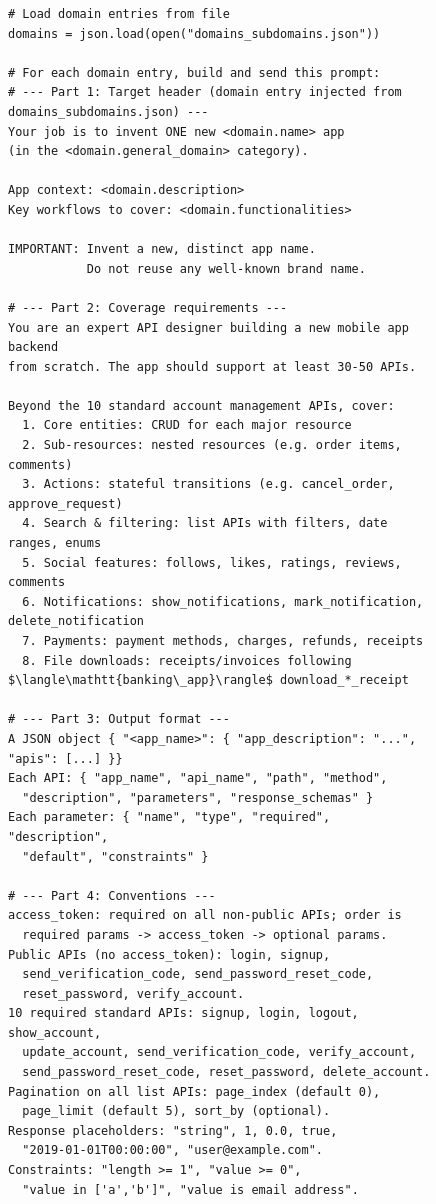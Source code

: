 \begin{figure}[t]
\begin{lstlisting}[style=prettyprompt,
  basicstyle=\ttfamily\scriptsize,
  breaklines=true,
  columns=fullflexible,
  captionpos=b,
  caption={Abbreviated structure of the Gemini prompt used for synthetic app generation. Domain entries are loaded from \texttt{domains\_subdomains.json} at runtime; \texttt{<domain.*>} placeholders are filled from the current entry. Ellipses (\texttt{...}) denote sections paraphrased for brevity.},
  label={lst:gemini_prompt}]
# Load domain entries from file
domains = json.load(open("domains_subdomains.json"))

# For each domain entry, build and send this prompt:
# --- Part 1: Target header (domain entry injected from domains_subdomains.json) ---
Your job is to invent ONE new <domain.name> app
(in the <domain.general_domain> category).

App context: <domain.description>
Key workflows to cover: <domain.functionalities>

IMPORTANT: Invent a new, distinct app name.
           Do not reuse any well-known brand name.

# --- Part 2: Coverage requirements ---
You are an expert API designer building a new mobile app backend
from scratch. The app should support at least 30-50 APIs.

Beyond the 10 standard account management APIs, cover:
  1. Core entities: CRUD for each major resource
  2. Sub-resources: nested resources (e.g. order items, comments)
  3. Actions: stateful transitions (e.g. cancel_order, approve_request)
  4. Search & filtering: list APIs with filters, date ranges, enums
  5. Social features: follows, likes, ratings, reviews, comments
  6. Notifications: show_notifications, mark_notification, delete_notification
  7. Payments: payment methods, charges, refunds, receipts
  8. File downloads: receipts/invoices following $\langle\mathtt{banking\_app}\rangle$ download_*_receipt

# --- Part 3: Output format ---
A JSON object { "<app_name>": { "app_description": "...", "apis": [...] }}
Each API: { "app_name", "api_name", "path", "method",
  "description", "parameters", "response_schemas" }
Each parameter: { "name", "type", "required", "description",
  "default", "constraints" }

# --- Part 4: Conventions ---
access_token: required on all non-public APIs; order is
  required params -> access_token -> optional params.
Public APIs (no access_token): login, signup,
  send_verification_code, send_password_reset_code,
  reset_password, verify_account.
10 required standard APIs: signup, login, logout, show_account,
  update_account, send_verification_code, verify_account,
  send_password_reset_code, reset_password, delete_account.
Pagination on all list APIs: page_index (default 0),
  page_limit (default 5), sort_by (optional).
Response placeholders: "string", 1, 0.0, true,
  "2019-01-01T00:00:00", "user@example.com".
Constraints: "length >= 1", "value >= 0",
  "value in ['a','b']", "value is email address".


\end{lstlisting}
\end{figure}

